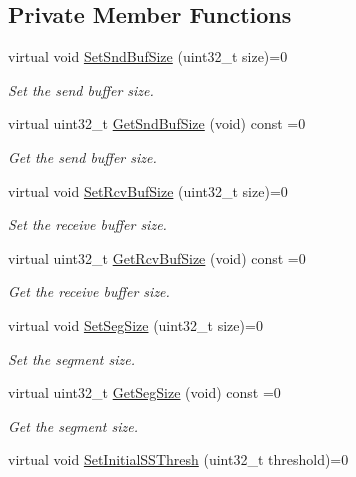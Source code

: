 \subsection*{Private Member Functions}
\begin{DoxyCompactItemize}
\item 
virtual void \hyperlink{classns3_1_1TcpSocket_ab82368990962d308cd4572129b5e1f85}{Set\+Snd\+Buf\+Size} (uint32\+\_\+t size)=0
\begin{DoxyCompactList}\small\item\em Set the send buffer size. \end{DoxyCompactList}\item 
virtual uint32\+\_\+t \hyperlink{classns3_1_1TcpSocket_ab214c236e683f88ea8dc38d564dd54bc}{Get\+Snd\+Buf\+Size} (void) const =0
\begin{DoxyCompactList}\small\item\em Get the send buffer size. \end{DoxyCompactList}\item 
virtual void \hyperlink{classns3_1_1TcpSocket_a16cf22dda11f238c7a4f71501c01ca9a}{Set\+Rcv\+Buf\+Size} (uint32\+\_\+t size)=0
\begin{DoxyCompactList}\small\item\em Set the receive buffer size. \end{DoxyCompactList}\item 
virtual uint32\+\_\+t \hyperlink{classns3_1_1TcpSocket_ab71a79da5991d3c789be3d72a89429a5}{Get\+Rcv\+Buf\+Size} (void) const =0
\begin{DoxyCompactList}\small\item\em Get the receive buffer size. \end{DoxyCompactList}\item 
virtual void \hyperlink{classns3_1_1TcpSocket_a9328f877a2c8659298d363b11e8689c1}{Set\+Seg\+Size} (uint32\+\_\+t size)=0
\begin{DoxyCompactList}\small\item\em Set the segment size. \end{DoxyCompactList}\item 
virtual uint32\+\_\+t \hyperlink{classns3_1_1TcpSocket_a86014de940c3824e18e96cf04b74fe55}{Get\+Seg\+Size} (void) const =0
\begin{DoxyCompactList}\small\item\em Get the segment size. \end{DoxyCompactList}\item 
virtual void \hyperlink{classns3_1_1TcpSocket_a068de8f7bcb9864c95d8c722d8d56e5f}{Set\+Initial\+S\+S\+Thresh} (uint32\+\_\+t threshold)=0

\end{DoxyCompactItemize}
